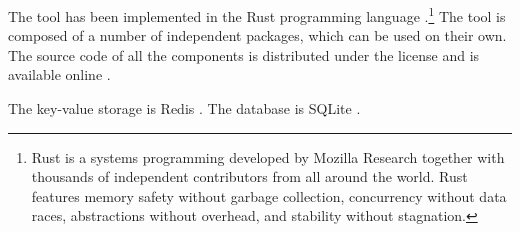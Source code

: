 The tool has been implemented in the Rust programming language
\cite{rust}.\footnote{Rust is a systems programming developed by Mozilla
Research together with thousands of independent contributors from all around the
world. Rust features memory safety without garbage collection, concurrency
without data races, abstractions without overhead, and stability without
stagnation.} The tool is composed of a number of independent packages, which can
be used on their own. The source code of all the components is distributed under
the  license and is available online \cite{sources}.

The key-value storage is Redis \cite{redis}. The database is SQLite
\cite{sqlite}.
